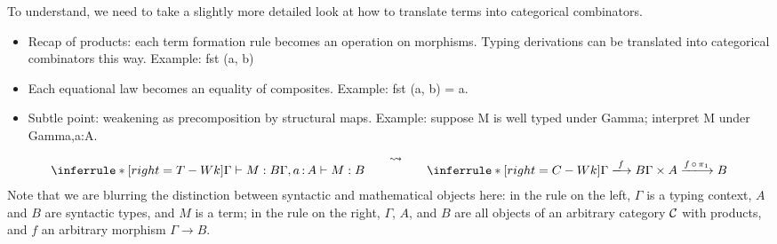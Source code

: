 \noindent To understand, we need to take a slightly more detailed look at how to
    translate terms into categorical combinators.
\begin{itemize}
  \item Recap of products: each term formation rule becomes an operation on morphisms.
    Typing derivations can be translated into categorical combinators this way.
    Example: fst (a, b)
  \item Each equational law becomes an equality of composites.
    Example: fst (a, b) = a.
  \item Subtle point: weakening as precomposition by structural maps.
    Example: suppose M is well typed under Gamma; interpret M under Gamma,a:A.
\end{itemize}
\begin{align*}
  \inferrule*[right=T-Wk]
    {\Gamma \vdash M : B}
    {\Gamma, a\ofty A \vdash M : B}
  \qquad\raisebox{1em}{\(\leadsto\)}\qquad
  \inferrule*[right=C-Wk]
    {\Gamma \xlongrightarrow{f} B}
    {\Gamma \times A \xlongrightarrow{f\,\circ\,\pi_1} B}
\end{align*}
Note that we are blurring the distinction between syntactic and mathematical objects here:
in the rule on the left, \(\Gamma\) is a typing context, \(A\) and \(B\)
are syntactic types, and \(M\) is a term;
in the rule on the right, \(\Gamma\), \(A\), and \(B\) are all objects of an
arbitrary category \(\mathcal C\) with products,
and \(f\) an arbitrary morphism \(\Gamma \to B\).


